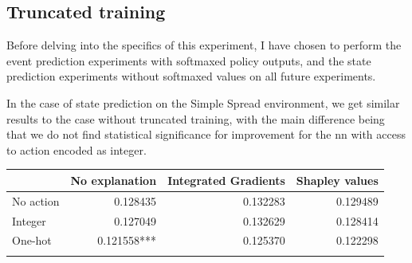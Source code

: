 \documentclass[UKenglish]{uiomasterthesis}
\begin{document}
\subsection{Truncated training}
Before delving into the specifics of this experiment, I have chosen to perform the event prediction experiments with softmaxed policy outputs, and the state prediction experiments without softmaxed values on all future experiments.

In the case of state prediction on the Simple Spread environment, we get similar results to the case without truncated training, with the main difference being that we do not find statistical significance for improvement for the \ac{nn} with access to action encoded as integer.

\begin{center}
\label{tab:state_simpl_trunc}
\begin{tabular}{lrrr}
\toprule
& No explanation & Integrated Gradients & Shapley values \\
\midrule
No action & 0.128435 & 0.132283 & 0.129489 \\
Integer & 0.127049 & 0.132629 & 0.128414 \\
One-hot & 0.121558*** & 0.125370 & 0.122298 \\
\bottomrule
\addlinespace[2pt]
\multicolumn{3}{l}{\textsuperscript{***}$p<0.001$, 
  \textsuperscript{**}$p<0.01$, 
  \textsuperscript{*}$p<0.05$}
\end{tabular}
\end{center}
\end{document}
